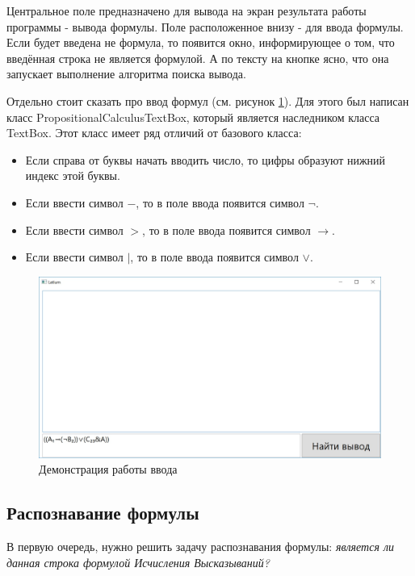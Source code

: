 \documentclass[a4paper,12pt]{article}
\theoremstyle{definition}
\begin{document}
	Центральное поле предназначено для вывода на экран результата работы программы - вывода формулы. Поле расположенное внизу - для ввода формулы. Если будет введена не формула, то появится окно, информирующее о том, что введённая строка не является формулой. А  по тексту на кнопке ясно, что она запускает выполнение алгоритма поиска вывода.
	
	Отдельно стоит сказать про ввод формул (см. рисунок \ref{exmpEnter}). Для этого был написан класс PropositionalCalculusTextBox, который является наследником класса TextBox. Этот класс имеет ряд отличий от базового класса:
	\begin{itemize}
		\item Если справа от буквы начать вводить число, то цифры образуют нижний индекс этой буквы.
		\item Если ввести символ $ - $, то в поле ввода появится символ $\lnot$.
		\item Если ввести символ $ > $, то в поле ввода появится символ $\to$.
		\item Если ввести символ $ | $, то в поле ввода появится символ $\lor$.
	\end{itemize}

	\begin{figure}[h]
		\begin{center}
			\includegraphics[width=0.8\linewidth]{exmpEnter}
		\end{center}
		\caption{Демонстрация работы ввода}
		\label{exmpEnter}
	\end{figure}
		
	\subsection{Распознавание формулы}
	В первую очередь, нужно решить задачу распознавания формулы: \textit{является ли данная строка формулой Исчисления Высказываний?}
	
\end{document}
